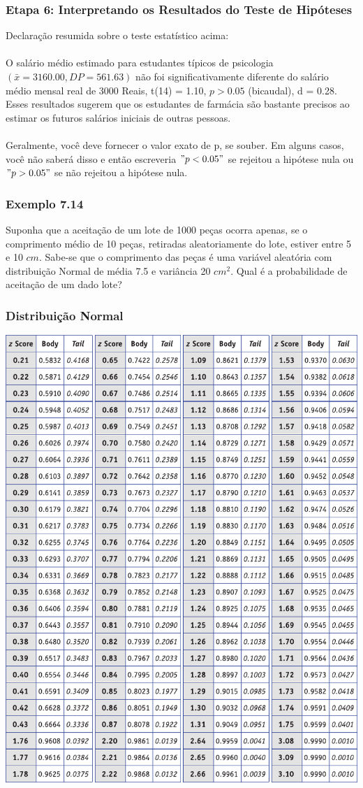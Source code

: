 \documentclass[11pt]{beamer}
\begin{document}
\begin{frame}
\frametitle{Etapa 6: Interpretando os Resultados do Teste de Hipóteses}

Declaração resumida sobre o teste estatístico acima:\\~\\

O salário médio estimado para estudantes típicos de psicologia $(\bar{x} = 3160.00, DP = 561.63)$ não foi significativamente diferente do salário médio mensal real de 3000 Reais, t(14) = 1.10, $p > 0.05$ (bicaudal), d = 0.28. Esses resultados sugerem que os estudantes de farmácia são bastante precisos ao estimar os futuros salários iniciais de outras pessoas.\\~\\

Geralmente, você deve fornecer o valor exato de p, se souber. Em alguns casos, você não saberá disso e então escreveria \("p < 0.05"\) se rejeitou a hipótese nula ou \("p > 0.05"\) se não rejeitou a hipótese nula.
\end{frame}

\begin{frame}
\frametitle{Exemplo 7.14}
Suponha que a aceitação de um lote de 1000 peças ocorra apenas, se o comprimento médio de 10 peças, retiradas aleatoriamente do lote, estiver entre 5 e 10 \(cm\). Sabe-se que o comprimento das peças é uma variável aleatória com distribuição Normal de média 7.5 e variância 20 \(cm^2\). Qual é a probabilidade de aceitação de um dado lote?
\vspace{1in}
\vspace{1in}

\end{frame}

\begin{frame}
\frametitle{Distribuição Normal}

\begin{center}\includegraphics[width=0.5\linewidth]{figs/ztab_crop2} \end{center}
\end{frame}
\end{document}
